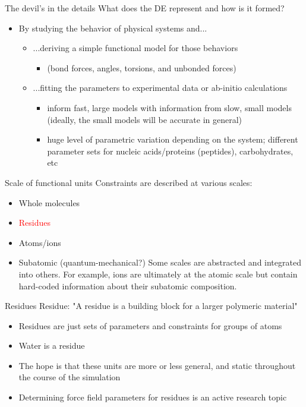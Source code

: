 \documentclass{beamer}
\begin{document}
\begin{frame}{The devil's in the details}
What does the DE represent and how is it formed?
\begin{itemize}
    \item By studying the behavior of physical systems and...
    \begin{itemize}
        \item ...deriving a simple functional model for those behaviors
        \begin{itemize}
            \item (bond forces, angles, torsions, and unbonded forces)
        \end{itemize}
        \item ...fitting the parameters to experimental data or ab-initio
            calculations
        \begin{itemize}
            \item inform fast, large models with information from slow, small
                models (ideally, the small models will be accurate in general)
            \item huge level of parametric variation depending on the
                system; different parameter sets for nucleic acids/proteins
                (peptides), carbohydrates, etc
        \end{itemize}
    \end{itemize}
\end{itemize}
\end{frame}


\begin{frame}{Scale of functional units}
Constraints are described at various scales:
\begin{itemize}
    \item Whole molecules
    \item \textcolor{red}{Residues}
    \item Atoms/ions
    \item Subatomic (quantum-mechanical?)
Some scales are abstracted and integrated into others. For example, ions are
ultimately at the atomic scale but contain hard-coded information about their
subatomic composition.

\end{itemize}
\end{frame}


\begin{frame}{Residues}
Residue: "A residue is a building block for a larger polymeric material"
\begin{itemize}
    \item Residues are just sets of parameters and constraints for groups of atoms
    \item Water is a residue
    \item The hope is that these units are more or less general, and static
        throughout the course of the simulation
    \item Determining force field parameters for residues is an active research topic

\end{itemize}
\end{frame}
\end{document}
